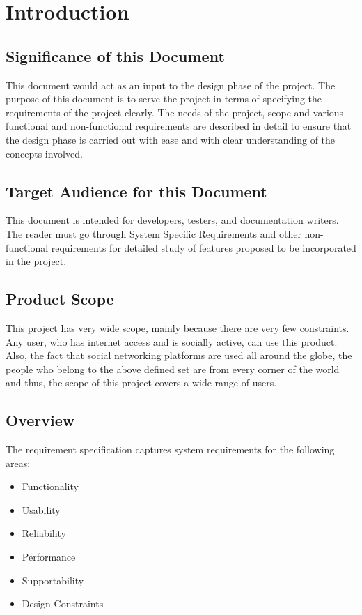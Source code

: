 \documentclass[12pt]{article}
\begin{document}
\newpage
\tableofcontents
\newpage

\section{Introduction}
\subsection{Significance of this Document}
This document would act as an input to the design phase of the project.
The purpose of this document is to serve the project in terms of specifying
the requirements of the project clearly. The needs of the project, scope
and various functional and non-functional requirements are described in
detail to ensure that the design phase is carried out with ease and with
clear understanding of the concepts involved.

\subsection{Target Audience for this Document}
This document is intended for developers, testers, and documentation writers.
The reader must go through System Specific Requirements and other non-functional requirements for detailed study of features proposed to be incorporated in the project.

\subsection{Product Scope}
This project has very wide scope, mainly because there are very few
constraints. Any user, who has internet access and is socially active, can
use this product. Also, the fact that social networking platforms are used
all around the globe, the people who belong to the above defined set are
from every corner of the world and thus, the scope of this project covers
a wide range of users.

\subsection{Overview}
The requirement specification captures system requirements for the
following areas:
\begin{itemize}
    \item Functionality
    \item Usability
    \item Reliability
    \item Performance
    \item Supportability
    \item Design Constraints
 
\end{itemize}
\end{document}
